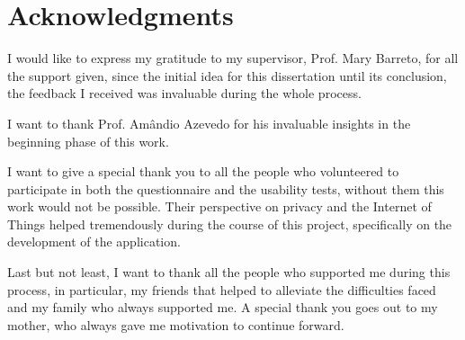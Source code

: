%
%
\chapter*{Acknowledgments}

I would like to express my gratitude to my supervisor, Prof. Mary Barreto, for
all the support given, since the initial idea for this dissertation until its conclusion,
the feedback I received was invaluable during the whole process.

I want to thank Prof. Amândio Azevedo for his invaluable insights in the beginning phase of
this work.

I want to give a special thank you to all the people who volunteered to
participate in both the questionnaire and the usability tests, without them this work
would not be possible. Their perspective on privacy and the Internet of Things helped
tremendously during the course of this project, specifically on the development of the application.

Last but not least, I want to thank all the people who supported me during this
process, in particular, my friends that helped to alleviate the difficulties faced and
my family who always supported me. A special thank you goes out to my mother,
who always gave me motivation to continue forward.
